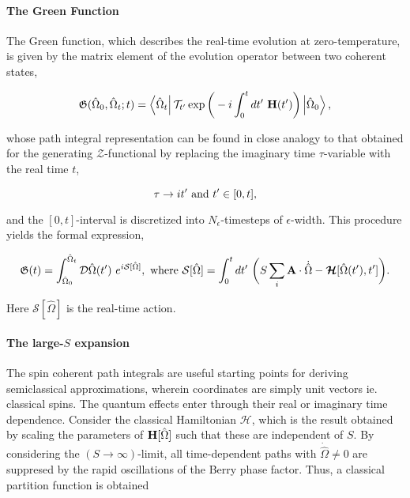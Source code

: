 \paragraph{The Green Function}

The Green function, which describes the real-time evolution at zero-temperature, is given by the matrix element of the evolution operator between two coherent states, 

\begin{equation}
    \mathfrak{G}(\hat{\Omega}_0, \hat{\Omega}_t; t) = \bra{\hat{\Omega}_t} \mathcal{T}_{t'} \exp \bigg(-i \int_{0}^{t} dt' \textnormal{ } {\bf H}(t')\bigg) \ket{\hat{\Omega}_0},
\end{equation}

whose path integral representation can be found in close analogy to that obtained for the generating $\mathcal{Z}$-functional by replacing the imaginary time $\tau$-variable with the real time $t$,

\begin{equation*}
    \tau \rightarrow it' \textnormal{ and } t' \in [0,t],
\end{equation*}

and the $[0,t]$-interval is discretized into $N_{\epsilon}$-timesteps of $\epsilon$-width. This procedure yields the formal expression, 

\begin{equation}
    \mathfrak{G}(t) = \int_{\hat{\Omega}_0}^{\hat{\Omega}_t} \mathcal{D} \hat{\Omega}(t') \textnormal{ } e^{i \mathcal{S}[\hat{\Omega}]}, \textnormal{ where } \mathcal{S}[\hat{\Omega}] = \int_{0}^{t} dt' \textnormal{ } \bigg(S \sum_{i} {\bf A} \cdot \dot{\hat{\Omega}} - \bm{\mathcal{H}}[\hat{\Omega}(t'), t'] \bigg).
\end{equation}

Here $\mathcal{S}[\hat{\Omega}]$ is the real-time action. \\

\paragraph{The large-$S$ expansion} 

The spin coherent path integrals are useful starting points for deriving semiclassical approximations, wherein coordinates are simply unit vectors ie. classical spins. The quantum effects enter through their real or imaginary time dependence. Consider the classical Hamiltonian $\bm{\mathcal{H}}$, which is the result obtained by scaling the parameters of ${\bf H}[\hat{\Omega}]$ such that these are independent of $S$. By considering the $(S \rightarrow \infty)$-limit, all time-dependent paths with $\dot{\hat{\Omega}} \neq 0$ are suppresed by the rapid oscillations of the Berry phase factor. Thus, a classical partition function is obtained 

